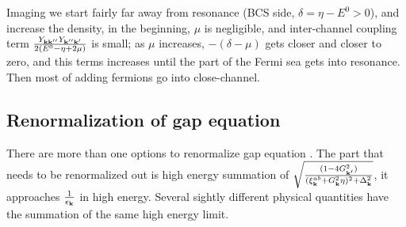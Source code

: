 Imaging we start fairly far away from resonance (BCS side, $\delta=\eta-E^{0}>0$), and increase the density, in the beginning, $\mu$ is negligible, and inter-channel coupling term $\frac{Y_{\mathbf{k}\mathbf{k}''}Y_{\mathbf{k}''\mathbf{k}'}}{2(E^{0}-\eta+2\mu)} $ is small; as $\mu$  increases, $-(\delta-\mu)$ gets closer and closer to zero, and this terms increases until the part of the Fermi sea gets into resonance.  Then most of adding fermions go into close-channel.  





\subsection{Renormalization of gap equation}
There are more than one options to renormalize gap equation .  The part that needs to be renormalized out is  high energy summation of $\sqrt{\frac{(1-4G_{\mathbf{k}'}^{2})}{{(\xi^{ab}_{\mathbf{k}}+  G_{\mathbf{k}}^2\eta)^{2}+\Delta_{\mathbf{k}}^{2}}}}$, it approaches $\frac{1}{\epsilon_{\mathbf{k}}}$ in high energy.  Several sightly different physical quantities have the summation of the same high energy limit.  
